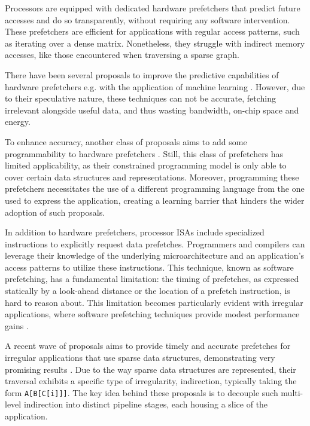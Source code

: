 \documentclass{acaces}
\begin{document}
Processors are equipped with dedicated hardware prefetchers that predict future accesses and do so transparently, without requiring any software intervention.
These prefetchers are efficient for applications with regular access patterns, such as iterating over a dense matrix.
Nonetheless, they struggle with indirect memory accesses, like those encountered when traversing a sparse graph.

There have been several proposals to improve the predictive capabilities of hardware prefetchers e.g. with the application of machine learning \cite{bera_pythia_2021}.
However, due to their speculative nature, these techniques can not be accurate, fetching irrelevant alongside useful data, and thus wasting bandwidth, on-chip space and energy.

To enhance accuracy, another class of proposals aims to add some programmability to hardware prefetchers \cite{talati_prodigy_2021}.
Still, this class of prefetchers has limited applicability, as their constrained programming model is only able to cover certain data structures and representations.
Moreover, programming these prefetchers necessitates the use of a different programming language from the one used to express the application,
creating a learning barrier that hinders the wider adoption of such proposals.

In addition to hardware prefetchers, processor ISAs include specialized instructions to explicitly request data prefetches.
Programmers and compilers can leverage their knowledge of the underlying microarchitecture and an application's access patterns to utilize these instructions.
This technique, known as software prefetching, has a fundamental limitation:
the timing of prefetches, as expressed statically by a look-ahead distance or the location of a prefetch instruction, is hard to reason about.
This limitation becomes particularly evident with irregular applications,
where software prefetching techniques provide modest performance gains \cite{ainsworth_software_2018}.

A recent wave of proposals aims to provide timely and accurate prefetches for irregular applications that use sparse data structures,
demonstrating very promising results \cite{Manocha2021, Nguyen2023}.
Due to the way sparse data structures are represented,
their traversal exhibits a specific type of irregularity, indirection, typically taking the form \texttt{A[B[C[i]]]}.
The key idea behind these proposals is to decouple such multi-level indirection into distinct pipeline stages, each housing a slice of the application.
\end{document}

